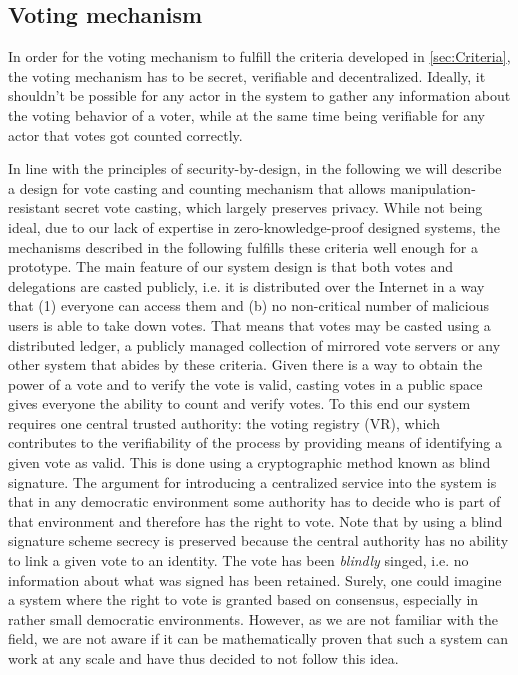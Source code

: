 \subsection{Voting mechanism}
\label{sec:Voting_Mechanism}
In order for the voting mechanism to fulfill the criteria developed in \ref{sec:Criteria}, the voting mechanism has to be secret, verifiable and decentralized. Ideally, it shouldn't be possible for any actor in the system to gather any information about the voting behavior of a voter, while at the same time being verifiable for any actor that votes got counted correctly. 

In line with the principles of security-by-design, in the following we will describe a design for vote casting and counting mechanism that allows manipulation-resistant secret vote casting, which largely preserves privacy.
While not being ideal, due to our lack of expertise in zero-knowledge-proof designed systems, the mechanisms described in the following fulfills these criteria well enough for a prototype.
The main feature of our system design is that both votes and delegations are casted publicly, i.e. it is distributed over the Internet in a way that (1) everyone can access them and (b) no non-critical number of malicious users is able to take down votes.
That means that votes may be casted using a distributed ledger, a publicly managed collection of mirrored vote servers or any other system that abides by these criteria.
Given there is a way to obtain the power of a vote and to verify the vote is valid, casting votes in a public space gives everyone the ability to count and verify votes.
To this end our system requires one central trusted authority: the voting registry (VR), which  contributes to the verifiability of the process by providing means of identifying a given vote as valid.
This is done using a cryptographic method known as blind signature.
The argument for introducing a centralized service into the system is that in any democratic environment some authority has to decide who is part of that environment and therefore has the right to vote.
Note that by using a blind signature scheme secrecy is preserved because the central authority has no ability to link a given vote to an identity.
The vote has been \emph{blindly} singed, i.e. no information about what was signed has been retained. 
Surely, one could imagine a system where the right to vote is granted based on consensus, especially in rather small democratic environments.
However, as we are not familiar with the field, we are not aware if it can be mathematically proven that such a system can work at any scale and have thus decided to not follow this idea.

